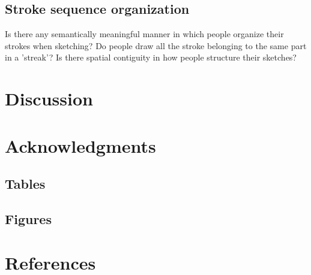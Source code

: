 \documentclass[10pt,letterpaper]{article}
\begin{document}
\subsection{Stroke sequence organization}
Is there any semantically meaningful manner in which people organize their strokes when sketching? Do people draw all the stroke belonging to the same part in a 'streak'? 
Is there spatial contiguity in how people structure their sketches?

\section{Discussion}


\section{Acknowledgments}


\subsection{Tables}


\subsection{Figures}






\section{References}



\setlength{\bibleftmargin}{.125in}
\setlength{\bibindent}{-\bibleftmargin}


\end{document}
